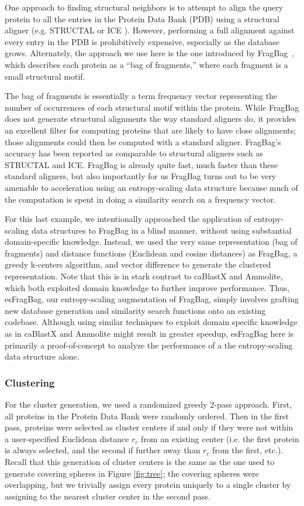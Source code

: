 \documentclass[review,preprint,12pt]{elsarticle}
\renewcommand{\cite}{\citep} %
\theoremstyle{definition}
\theoremstyle{remark}
\numberwithin{equation}{section}
\begin{document}
One approach to finding structural neighbors is to attempt to align the query protein to all the entries in the Protein Data Bank (PDB) using a structural aligner (e.g. STRUCTAL \cite{subbiah1993structural} or ICE \cite{shindyalov1998protein}).
However, performing a full alignment against every entry in the PDB is prohibitively expensive, especially as the database grows.
Alternately, the approach we use here is the one introduced by FragBag~\cite{budowski2010fragbag}, which describes each protein as a
``bag of fragments,'' where each fragment is a small structural motif.

The bag of fragments is essentially
a term frequency vector representing the number of occurrences of each structural motif within the protein.
While FragBag does not generate structural alignments the way standard aligners do, it provides an excellent
filter for computing proteins that are likely to have close alignments; those alignments could then be computed
with a standard aligner.
FragBag's accuracy has been reported as comparable to structural aligners such as STRUCTAL and
ICE.
FragBag is already quite fast, much faster than these standard aligners, but also importantly for us
FragBag turns out to be very amenable to acceleration using an entropy-scaling data structure because much of the computation is spent in doing a similarity search on a frequency vector.

For this last example, we intentionally approached the application of entropy-scaling data structures to FragBag in a blind manner,
without using substantial domain-specific knowledge.
Instead, we used the very same representation (bag of fragments) and distance functions (Euclidean and cosine distances)
as FragBag, a greedy k-centers algorithm, and vector difference to generate the clustered representation.
Note that this is in stark contrast to caBlastX and Ammolite, which both exploited domain knowledge to further improve performance.
Thus, esFragBag, our entropy-scaling augmentation of FragBag, simply involves grafting new database generation and similarity search functions onto an existing codebase.
Although using similar techniques to exploit domain specific knowledge as in caBlastX and Ammolite might result in greater speedup, esFragBag here is primarily a proof-of-concept to analyze the performance of a the entropy-scaling data structure alone.

\subsubsection{Clustering}
For the cluster generation, we used a randomized greedy 2-pass approach.
First, all proteins in the Protein Data Bank were randomly ordered.
Then in the first pass, proteins were selected as cluster centers if and only if they were not within a user-specified Euclidean distance $r_c$ from an existing center (i.e. the first protein is always selected, and the second if further away than $r_c$ from the first, etc.).
Recall that this generation of cluster centers is the same as the one used to generate covering spheres in Figure \ref{fig:tree};
the covering spheres were overlapping, but we trivially assign every protein uniquely to a single cluster by assigning to the nearest cluster center in the second pass.
\end{document}
